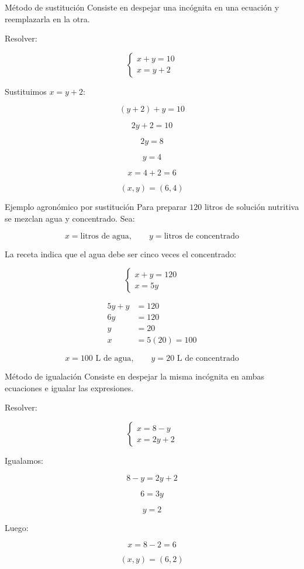 \documentclass[aspectratio=169]{beamer}
\begin{document}
\begin{frame}{Método de sustitución}
	Consiste en despejar una incógnita en una ecuación y reemplazarla en la otra.
	
	\bigskip
	
	Resolver:
	
	\[
	\begin{cases}
		x+y=10\\
		x=y+2
	\end{cases}
	\]
	
	Sustituimos \(x=y+2\):
	
	\[
	(y+2)+y=10
	\]
	
	\[
	2y+2=10
	\]
	
	\[
	2y=8
	\]
	
	\[
	y=4
	\]
	
	\[
	x=4+2=6
	\]
	
	\[
	\boxed{(x,y)=(6,4)}
	\]
\end{frame}

\begin{frame}{Ejemplo agronómico por sustitución}
	\small
	Para preparar \(120\) litros de solución nutritiva se mezclan agua y concentrado. Sea:
	
	\[
	x=\text{litros de agua}, \qquad y=\text{litros de concentrado}
	\]
	
	La receta indica que el agua debe ser cinco veces el concentrado:
	
	\[
	\begin{cases}
		x+y=120\\
		x=5y
	\end{cases}
	\]
	
	\begin{align*}
	5y+y&=120\\
	6y&=120\\
	y&=20\\
	x&=5(20)=100
	\end{align*}
	
	\[
	\boxed{x=100\text{ L de agua},\qquad y=20\text{ L de concentrado}}
	\]
\end{frame}
	
\begin{frame}{Método de igualación}
	Consiste en despejar la misma incógnita en ambas ecuaciones e igualar las expresiones.
	
	\bigskip
	
	Resolver:
	
	\[
	\begin{cases}
		x=8-y\\
		x=2y+2
	\end{cases}
	\]
	
	Igualamos:
	
	\[
	8-y=2y+2
	\]
	
	\[
	6=3y
	\]
	
	\[
	y=2
	\]
	
	Luego:
	
	\[
	x=8-2=6
	\]
	
	\[
	\boxed{(x,y)=(6,2)}
	\]
\end{frame}
\end{document}
